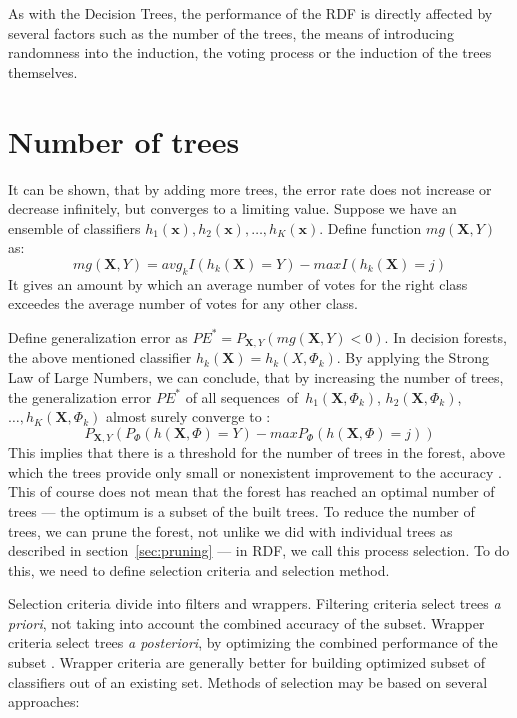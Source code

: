 \documentclass[thesis=B,english]{FITthesis}[2012/10/20]
\begin{document}
	As with the Decision Trees, the performance of the RDF is directly affected by several factors such as the number of the trees, the means of introducing randomness into the induction, the voting process or the induction of the trees themselves.



	\section{Number of trees}
	It can be shown, that by adding more trees, the error rate does not increase or decrease infinitely, but converges to a limiting value. Suppose we have an ensemble of classifiers \(h_1(\textbf{x}), h_2(\textbf{x}),\dots,h_K(\textbf{x})\). Define function \(\textit{mg}(\mathbf{X},Y)\) as:
	\[\textit{mg}(\mathbf{X},Y)=\textit{avg}_kI(h_k(\mathbf{X})=Y)-\textit{max}I(h_k(\mathbf{X})=j)\] It gives an amount by which an average number of votes for the right class exceedes the average number of votes for any other class. 

	Define generalization error as \(PE^*=P_{\mathbf{X},Y}(\textit{mg}(\mathbf{X},Y) < 0)\). In decision forests, the above mentioned classifier \(h_k(\textbf{X})=h_k(X, \Phi_k)\). By applying the Strong Law of Large Numbers, we can conclude, that by increasing the number of trees, the generalization error \(PE^*\) of all sequences~of~\(h_1(\mathbf{X},\Phi_k)\), \(h_2(\mathbf{X}, \Phi_k)\),~\(\dots, h_K(\mathbf{X}, \Phi_k)\) almost surely converge to \cite{BR01}:
	\[
	P_{\mathbf{X},Y}(P_{\Phi}(h(\mathbf{X}, \Phi)=Y)-\textit{max}P_{\Phi}(h(\mathbf{X}, \Phi)=j))
	\]
	This implies that there is a threshold for the number of trees in the forest, above which the trees provide only small or nonexistent improvement to the accuracy \cite{SELECTION_OF_DT}. This of course does not mean that the forest has reached an optimal number of trees --- the optimum is a subset of the built trees. To reduce the number of trees, we can prune the forest, not unlike we did with individual trees as described in section~\ref{sec:pruning} --- in RDF, we call this process selection. To do this, we need to define selection criteria and selection method.

	Selection criteria divide into filters and wrappers. Filtering criteria select trees \textit{a priori}, not taking into account the combined accuracy of the subset. Wrapper criteria select trees \textit{a posteriori}, by optimizing the combined performance of the subset \cite{PRUNING_RDF}. Wrapper criteria are generally better for building optimized subset of classifiers out of an existing set. Methods of selection may be based on several approaches:
\end{document}
